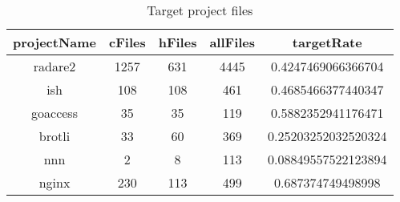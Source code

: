 \begin{table}[h]
	\caption{Target project files}
	\label{table:target_projects_files_table}	
		\begin{tabular}{ccccc}
		\hline
		projectName & cFiles & hFiles & allFiles & targetRate \\ 
		\hline \hline
		radare2 & 1257 & 631 & 4445 & 0.4247469066366704 \\ 
		\hline
		ish & 108 & 108 & 461 & 0.4685466377440347 \\ 
		\hline
		goaccess & 35 & 35 & 119 & 0.5882352941176471 \\ 
		\hline
		brotli & 33 & 60 & 369 & 0.25203252032520324 \\ 
		\hline
		nnn & 2 & 8 & 113 & 0.08849557522123894 \\ 
		\hline
		nginx & 230 & 113 & 499 & 0.687374749498998 \\ 
		\hline
	\end{tabular}
\end{table}